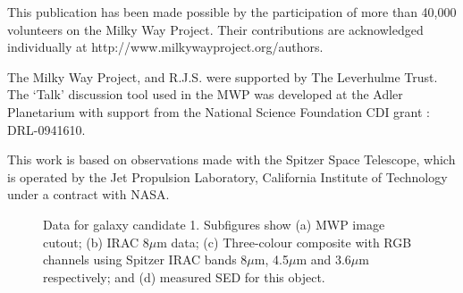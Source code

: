 \documentclass[times,usenatbib]{mn2e}
\begin{document}
This publication has been made possible by the participation of more than 40,000 volunteers on the Milky Way Project. Their contributions are acknowledged individually at http://www.milkywayproject.org/authors.

The Milky Way Project, and R.J.S. were supported by The Leverhulme Trust. The `Talk' discussion tool used in the MWP was developed at the Adler Planetarium with support from the National Science Foundation CDI grant : DRL-0941610. 

This work is based on observations made with the Spitzer Space Telescope, which is operated by the Jet Propulsion Laboratory, California Institute of Technology under a contract with NASA.




\clearpage


\begin{figure}
\begin{center}
\caption{Data for galaxy candidate 1. Subfigures show (a) MWP image cutout; (b) IRAC 8$\mu$m data; (c) Three-colour composite with RGB channels using Spitzer IRAC bands 8$\mu$m, 4.5$\mu$m and 3.6$\mu$m respectively; and (d) measured SED for this object.}
\label{gal1}
\end{center}
\end{figure} 
\end{document}
